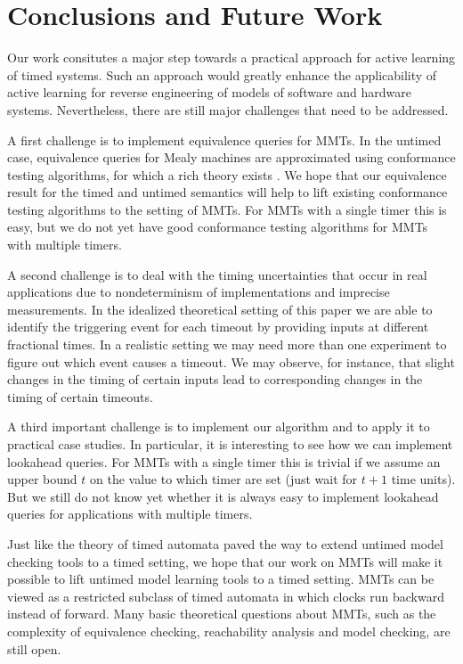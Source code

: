 \section{Conclusions and Future Work}
Our work consitutes a major step towards a practical approach for active learning of timed systems.
Such an approach would greatly enhance the applicability of active learning for reverse engineering of models of
software and hardware systems. Nevertheless, there are still major challenges that need to be addressed.

A first challenge is to implement equivalence queries for MMTs.
In the untimed case, equivalence queries for Mealy machines are approximated using conformance testing algorithms,
for which a rich theory exists \cite{LeeY96}.
We hope that our equivalence result for the timed and untimed semantics will help to lift existing conformance
testing algorithms to the setting of MMTs. For MMTs with a single timer this is easy, but we do not yet have good
conformance testing algorithms for MMTs with multiple timers.

A second challenge is to deal with the timing uncertainties that occur in real applications due to nondeterminism of
implementations and imprecise measurements. In the idealized theoretical setting of this paper we are able to
identify the triggering event for each timeout by providing inputs at different fractional times. In a realistic
setting we may need more than one experiment to figure out which event causes a timeout. We may observe, for instance,
that slight changes in the timing of certain inputs lead to corresponding changes in the timing of certain timeouts.

A third important challenge is to implement our algorithm and to apply it to practical case studies. In particular,
it is interesting to see how we can implement lookahead queries. For MMTs with a single timer this is trivial 
if we assume an upper bound $t$ on the value to which timer are set (just  wait for $t+1$ time units).
But we still do not know yet whether it is always easy to implement lookahead queries for applications with multiple timers.

Just like the theory of timed automata \cite{AD94} paved the way to extend untimed model checking tools to a timed
setting, we hope that our work on MMTs will make it possible to lift untimed model learning tools to a timed setting.
MMTs can be viewed as a restricted subclass of timed automata in which clocks run backward instead of forward.
Many basic theoretical questions about MMTs, such as the complexity of equivalence checking, reachability analysis
and model checking, are still open.
